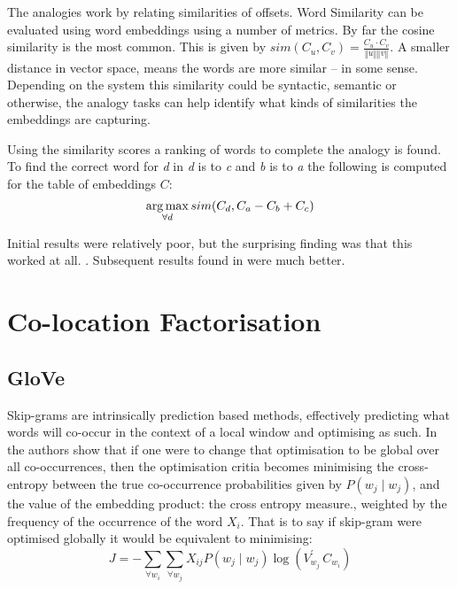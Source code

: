 \documentclass[parskip]{komatufte}
\begin{document}
The analogies work by relating similarities of offsets.
Word Similarity can be evaluated using word embeddings using a number of metrics.
By far the cosine similarity is the most common.
This is given by $sim(C_u, C_v)=\frac{C_{u}\cdot C_{v}}{\left\Vert u\right\Vert \left\Vert v\right\Vert }$.
A smaller distance in vector space, means the words are more similar -- in some sense.
Depending on the system this similarity could be syntactic, semantic or otherwise, the analogy tasks can help identify what kinds of similarities the embeddings are capturing.

Using the similarity scores a ranking of words to complete the analogy is found.
To find the correct word for \emph{d} in \emph{d} is to \emph{c} and \emph{b} is to \emph{a}
the following is computed for the table of embeddings $C$:
\begin{equation}
\operatorname*{arg\,max}_{\forall d} sim(C_d, C_a-C_b+C_c)
\end{equation}


Initial results were relatively poor, but the surprising finding was that this worked at all. .
Subsequent results found in  were much better.

\section{Co-location Factorisation}

\subsection{GloVe}

Skip-grams are intrinsically prediction based methods, effectively predicting what words will co-occur in the context of a local window and optimising as such.
In the authors show that if one were to change that optimisation to be global over all co-occurrences,
then the optimisation critia becomes minimising the cross-entropy between the true co-occurrence probabilities given by $P(w_j\mid w_j)$, and the value of the embedding product: the cross entropy measure.,
weighted by the frequency of the occurrence of the word $X_i$.
That is to say if skip-gram were optimised globally it would be equivalent to minimising:
\begin{equation}
J = - \sum_{\forall w_i} \sum_{\forall w_j} X_{ij} P(w_j\mid w_j) \log (V_{w_j}^\prime\,C_{w_{i}})
\end{equation}
\end{document}
